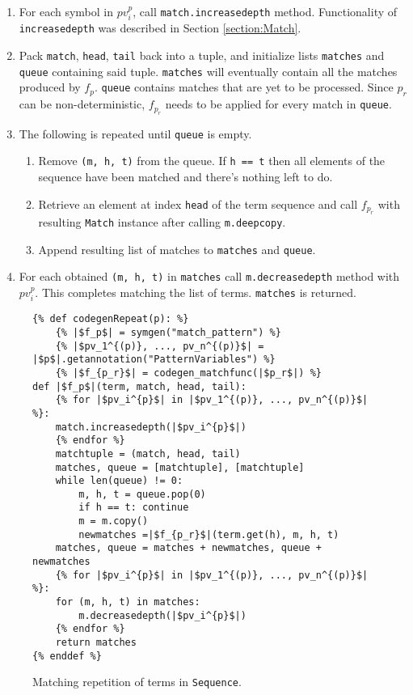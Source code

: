 \begin{enumerate}
\item
For each symbol in $pv_i^{p}$, call \texttt{match.increasedepth} method. Functionality of \texttt{increasedepth} was described in Section \ref{section:Match}. 
\item
Pack \texttt{match}, \texttt{head}, \texttt{tail} back into a tuple, and initialize lists \texttt{matches} and \texttt{queue} containing said tuple. \texttt{matches} will eventually contain all the matches produced by $f_p$. \texttt{queue} contains matches that are yet to be processed. Since $p_r$ can be non-deterministic, $f_{p_r}$ needs to be applied for every match in \texttt{queue}. 
\item The following is repeated until \texttt{queue} is empty. 
	\begin{enumerate}
	\item 
	Remove \texttt{(m, h, t)} from the queue. If \texttt{h == t} then all elements of the sequence have been matched and there's nothing left to do.  	
	\item
	Retrieve an element at index \texttt{head} of the term sequence and call $f_{p_r}$ with resulting \texttt{Match} instance after calling \texttt{m.deepcopy}.
	\item Append resulting list of matches to \texttt{matches} and \texttt{queue}.
	\end{enumerate}

\item
For each obtained \texttt{(m, h, t)} in \texttt{matches} call \texttt{m.decreasedepth} method with $pv_i^{p}$. This completes matching the list of terms. \texttt{matches} is returned.
\end{enumerate}

\begin{figure}
\begin{verbatim}
{% def codegenRepeat(p): %}
	{% |$f_p$| = symgen("match_pattern") %}
	{% |$pv_1^{(p)}, ..., pv_n^{(p)}$| = |$p$|.getannotation("PatternVariables") %}
	{% |$f_{p_r}$| = codegen_matchfunc(|$p_r$|) %}
def |$f_p$|(term, match, head, tail):
	{% for |$pv_i^{p}$| in |$pv_1^{(p)}, ..., pv_n^{(p)}$| %}:
	match.increasedepth(|$pv_i^{p}$|)
	{% endfor %}
	matchtuple = (match, head, tail)
	matches, queue = [matchtuple], [matchtuple]
	while len(queue) != 0:
		m, h, t = queue.pop(0)
		if h == t: continue
		m = m.copy()
		newmatches =|$f_{p_r}$|(term.get(h), m, h, t)
	matches, queue = matches + newmatches, queue + newmatches 
	{% for |$pv_i^{p}$| in |$pv_1^{(p)}, ..., pv_n^{(p)}$| %}:
	for (m, h, t) in matches: 
		m.decreasedepth(|$pv_i^{p}$|)
	{% endfor %}
	return matches
{% enddef %}
\end{verbatim}
\caption{Matching repetition of terms \RepeatNoArg \space in \texttt{Sequence}.}
\label{codegen-pattern-ellipsis-1}
\end{figure}


